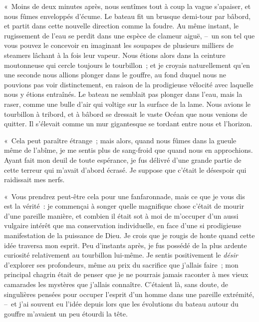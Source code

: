 \documentclass[french,twoside]{book} %
\begin{document}
« Moins de deux minutes après, nous sentîmes tout à coup la vague s’apaiser, et nous fûmes enveloppés d’écume. Le bateau fit un brusque demi-tour par bâbord, et partit dans cette nouvelle direction comme la foudre. Au même instant, le rugissement de l’eau se perdit dans une espèce de clameur aiguë, – un son tel que vous pouvez le concevoir en imaginant les soupapes de plusieurs milliers de steamers lâchant à la fois leur vapeur. Nous étions alors dans la ceinture moutonneuse qui cercle toujours le tourbillon ; et je croyais naturellement qu’en une seconde nous allions plonger dans le gouffre, au fond duquel nous ne pouvions pas voir distinctement, en raison de la prodigieuse vélocité avec laquelle nous y étions entraînés. Le bateau ne semblait pas plonger dans l’eau, mais la raser, comme une bulle d’air qui voltige sur la surface de la lame. Nous avions le tourbillon à tribord, et à bâbord se dressait le vaste Océan que nous venions de quitter. Il s’élevait comme un mur gigantesque se tordant entre nous et l’horizon.\par
« Cela peut paraître étrange ; mais alors, quand nous fûmes dans la gueule même de l’abîme, je me sentis plus de sang-froid que quand nous en approchions. Ayant fait mon deuil de toute espérance, je fus délivré d’une grande partie de cette terreur qui m’avait d’abord écrasé. Je suppose que c’était le désespoir qui raidissait mes nerfs.\par
« Vous prendrez peut-être cela pour une fanfaronnade, mais ce que je vous dis est la vérité : je commençai à songer quelle magnifique chose c’était de mourir d’une pareille manière, et combien il était sot à moi de m’occuper d’un aussi vulgaire intérêt que ma conservation individuelle, en face d’une si prodigieuse manifestation de la puissance de Dieu. Je crois que je rougis de honte quand cette idée traversa mon esprit. Peu d’instants après, je fus possédé de la plus ardente curiosité relativement au tourbillon lui-même. Je sentis positivement le \emph{désir} d’explorer ses profondeurs, même au prix du sacrifice que j’allais faire ; mon principal chagrin était de penser que je ne pourrais jamais raconter à mes vieux camarades les mystères que j’allais connaître. C’étaient là, sans doute, de singulières pensées pour occuper l’esprit d’un homme dans une pareille extrémité, – et j’ai souvent eu l’idée depuis lors que les évolutions du bateau autour du gouffre m’avaient un peu étourdi la tête.\par
\end{document}
